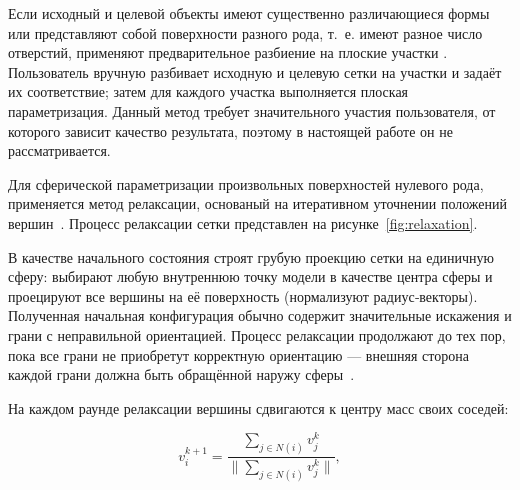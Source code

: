 	Если исходный и целевой объекты имеют существенно различающиеся формы или представляют собой поверхности разного рода, т.~е. имеют разное число отверстий, применяют предварительное разбиение на плоские участки \cite{mocanu}. Пользователь вручную разбивает исходную и целевую сетки на участки и задаёт их соответствие; затем для каждого участка выполняется плоская параметризация. Данный метод требует значительного участия пользователя, от которого зависит качество результата, поэтому в настоящей работе он не рассматривается.
    
	   

	Для сферической параметризации произвольных поверхностей нулевого рода, применяется метод релаксации, основаный на итеративном уточнении положений вершин~\cite{alexa}. Процесс релаксации сетки представлен на рисунке~\ref{fig:relaxation}. 

	В качестве начального состояния строят грубую проекцию сетки на единичную сферу: выбирают любую внутреннюю точку модели в качестве центра сферы и проецируют все вершины на её поверхность (нормализуют радиус‑векторы). Полученная начальная конфигурация обычно содержит значительные искажения и грани с неправильной ориентацией. Процесс релаксации продолжают до тех пор, пока все грани не приобретут корректную ориентацию — внешняя сторона каждой грани должна быть обращённой наружу сферы~\cite{alexa}.

	На каждом раунде релаксации вершины сдвигаются к центру масс своих соседей:
	
	\begin{equation}
		v_i^{k + 1} = \frac{\sum_{j \in N(i)} v_j^{k}}{\parallel \sum_{j \in N(i)} v_j^{k} \parallel}, 
	\end{equation}
	
